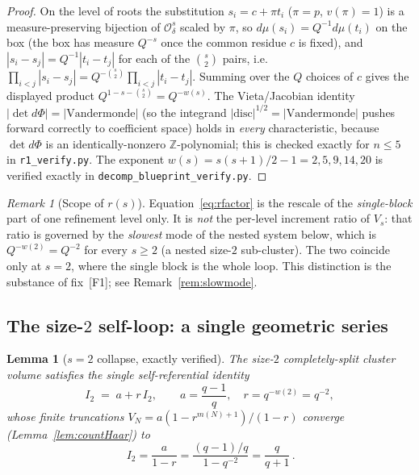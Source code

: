 \documentclass[11pt]{article}
\newtheorem{lemma}[theorem]{Lemma}
\theoremstyle{definition}
\theoremstyle{remark}
\newtheorem{remark}[theorem]{Remark}
\newcommand{\Odelta}{\mathcal{O}_\delta}
\newcommand{\disc}{\mathrm{disc}}
\newcommand{\vp}{v}
\begin{document}
\begin{proof}
On the level of roots the substitution $s_i=c+\pi t_i$ ($\pi=p$, $\vp(\pi)=1$) is a
measure-preserving bijection of $\Odelta^s$ scaled by $\pi$, so
$d\mu(s_i)=Q^{-1}d\mu(t_i)$ on the box (the box has measure $Q^{-s}$ once the common
residue $c$ is fixed), and $|s_i-s_j|=Q^{-1}|t_i-t_j|$ for each of the $\binom s2$
pairs, i.e.\ $\prod_{i<j}|s_i-s_j|=Q^{-\binom s2}\prod_{i<j}|t_i-t_j|$. Summing over
the $Q$ choices of $c$ gives the displayed product $Q^{1-s-\binom s2}=Q^{-w(s)}$.
The Vieta/Jacobian identity $|\det d\Phi|=|\mathrm{Vandermonde}|$ (so the integrand
$|\disc|^{1/2}=|\mathrm{Vandermonde}|$ pushes forward correctly to coefficient
space) holds in \emph{every} characteristic, because $\det d\Phi$ is an
identically-nonzero $\mathbb Z$-polynomial; this is checked exactly for $n\le5$ in
\texttt{r1\_verify.py}. The exponent $w(s)=s(s+1)/2-1=2,5,9,14,20$ is verified
exactly in \texttt{decomp\_blueprint\_verify.py}.
\end{proof}

\begin{remark}[Scope of $r(s)$]
Equation~\eqref{eq:rfactor} is the rescale of the \emph{single-block} part of one
refinement level only. It is \emph{not} the per-level increment ratio of $V_s$:
that ratio is governed by the \emph{slowest} mode of the nested system below, which
is $Q^{-w(2)}=Q^{-2}$ for every $s\ge2$ (a nested size-$2$ sub-cluster). The two
coincide only at $s=2$, where the single block is the whole loop. This distinction
is the substance of fix~[F1]; see Remark~\ref{rem:slowmode}.
\end{remark}

\subsection{The size-$2$ self-loop: a single geometric series}

\begin{lemma}[$s=2$ collapse, exactly verified]\label{lem:s2}
The size-$2$ completely-split cluster volume satisfies the \emph{single}
self-referential identity
\begin{equation}\label{eq:s2self}
  I_2 \;=\; a + r\,I_2,\qquad a=\frac{q-1}{q},\quad r=q^{-w(2)}=q^{-2},
\end{equation}
whose finite truncations $V_N=a(1-r^{m(N)+1})/(1-r)$ converge (Lemma~\ref{lem:countHaar})
to
\begin{equation}\label{eq:s2limit}
  \boxed{\,I_2=\frac{a}{1-r}=\frac{(q-1)/q}{1-q^{-2}}=\frac{q}{q+1}\,.}
\end{equation}
\end{lemma}
\end{document}
